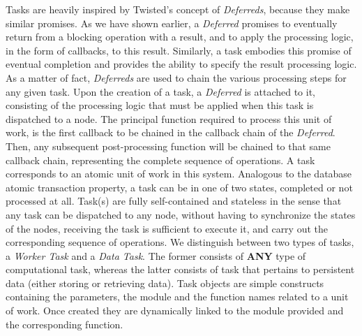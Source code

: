 \documentclass[12pt, titlepage]{uo_temp}
\begin{document}
     Tasks are heavily inspired by Twisted's concept of \emph{Deferreds}, because they
     make similar promises. As we have shown earlier, a \emph{Deferred} promises to
     eventually return from a blocking operation with a result, and to apply the
     processing logic, in the form of callbacks, to this result. Similarly, a task
     embodies this promise of eventual completion and provides the ability to specify the
     result processing logic. As a matter of fact, \emph{Deferreds} are used to chain the
     various processing steps for any given task. Upon the creation of a task, a
     \emph{Deferred} is attached to it, consisting of the processing logic that must be
     applied when this task is dispatched to a node. The principal function required to
     process this unit of work, is the first callback to be chained in the callback chain
     of the \emph{Deferred}. Then, any subsequent post-processing function will be chained
     to that same callback chain, representing the complete sequence of operations.
     A task corresponds to an atomic unit of work in this system. Analogous to the
     database atomic transaction property, a task can be in one of two states, completed
     or not processed at all. Task(s) are fully self-contained and stateless in the sense
     that any task can be dispatched to any node, without having to synchronize the
     states of the nodes, receiving the task is sufficient to execute it, and carry out
     the corresponding sequence of operations. We distinguish between two types of tasks, a
     \emph{Worker Task} and a \emph{Data Task}. The former consists of \textbf{ANY} type
     of computational task, whereas the latter consists of task that pertains to
     persistent data (either storing or retrieving data).
     Task objects are simple constructs containing the parameters, the module and the
     function names related to a unit of work. Once created they are dynamically linked to
     the module provided and the corresponding function.
\end{document}
